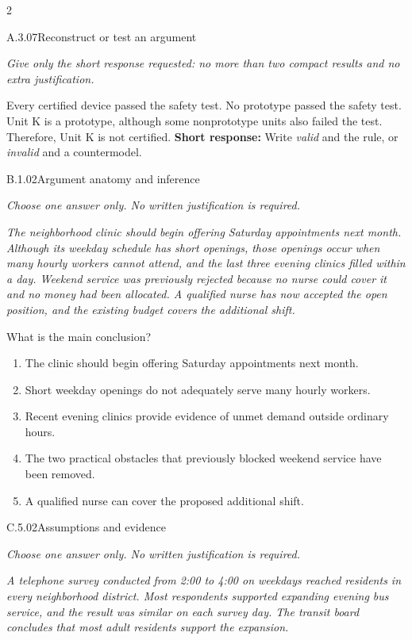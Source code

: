 \documentclass[9pt]{extarticle}
\newcommand{\choice}[1]{\item #1}
\begin{document}
\begin{multicols}{2}
\begin{DenseCoreProblem}{A.3.07}{Reconstruct or test an argument}
{\scriptsize\textit{Give only the short response requested: no more than two compact results and no extra justification.}\par}
Every certified device passed the safety test. No prototype passed the safety test. Unit K is a prototype, although some nonprototype units also failed the test. Therefore, Unit K is not certified.
\textbf{Short response:} Write \emph{valid} and the rule, or \emph{invalid} and a countermodel.
\end{DenseCoreProblem}
\begin{DenseCoreProblem}{B.1.02}{Argument anatomy and inference}
{\scriptsize\textit{Choose one answer only. No written justification is required.}\par}
\emph{The neighborhood clinic should begin offering Saturday appointments next month. Although its weekday schedule has short openings, those openings occur when many hourly workers cannot attend, and the last three evening clinics filled within a day. Weekend service was previously rejected because no nurse could cover it and no money had been allocated. A qualified nurse has now accepted the open position, and the existing budget covers the additional shift.}

What is the main conclusion?
\begin{enumerate}[label=(\alph*)]
  \choice{The clinic should begin offering Saturday appointments next month.}
  \choice{Short weekday openings do not adequately serve many hourly workers.}
  \choice{Recent evening clinics provide evidence of unmet demand outside ordinary hours.}
  \choice{The two practical obstacles that previously blocked weekend service have been removed.}
  \choice{A qualified nurse can cover the proposed additional shift.}
\end{enumerate}
\end{DenseCoreProblem}
\columnbreak
\begin{DenseCoreProblem}{C.5.02}{Assumptions and evidence}
{\scriptsize\textit{Choose one answer only. No written justification is required.}\par}
\emph{A telephone survey conducted from 2:00 to 4:00 on weekdays reached residents in every neighborhood district. Most respondents supported expanding evening bus service, and the result was similar on each survey day. The transit board concludes that most adult residents support the expansion.}


\end{DenseCoreProblem}
\end{multicols}
\end{document}
